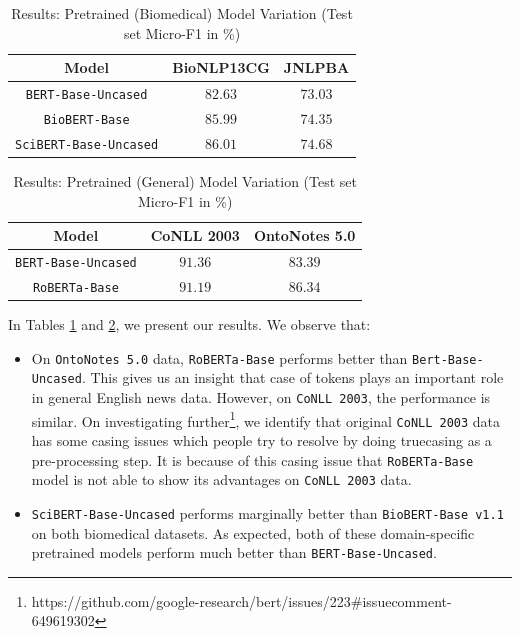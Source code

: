 \begin{table}[h!]
\centering
\begin{tabular}{|c|c|c|}\hline
	\textbf{Model} & \textbf{BioNLP13CG} & \textbf{JNLPBA}\\\hline
	\texttt{BERT-Base-Uncased} & $82.63$ & $73.03$\\\hline
	\texttt{BioBERT-Base} & $85.99$ & $74.35$\\\hline
	\texttt{SciBERT-Base-Uncased} & $86.01$ & $74.68$\\\hline
	\end{tabular}
    \caption{Results: Pretrained (Biomedical) Model Variation (Test set Micro-F1 in \%)}
    \label{tab:res_pretrained_model_bio}
\end{table}

\begin{table}[h!]
\centering
\begin{tabular}{|c|c|c|}\hline
	\textbf{Model} & \textbf{CoNLL 2003} & \textbf{OntoNotes 5.0}\\\hline
	\texttt{BERT-Base-Uncased} & $91.36$ & $83.39$\\\hline
	\texttt{RoBERTa-Base} & $91.19$ & $86.34$\\\hline
	\end{tabular}
    \caption{Results: Pretrained (General) Model Variation (Test set Micro-F1 in \%)}
    \label{tab:res_pretrained_model_general}
\end{table}

In Tables \ref{tab:res_pretrained_model_bio} and \ref{tab:res_pretrained_model_general}, we present our results. We observe that:

\begin{itemize}
    \item On \texttt{OntoNotes 5.0} data, \texttt{RoBERTa-Base} performs better than \texttt{Bert-Base-Uncased}. This gives us an insight that case of tokens plays an important role in general English news data. However, on \texttt{CoNLL 2003}, the performance is similar. On investigating further\footnote{https://github.com/google-research/bert/issues/223\#issuecomment-649619302}, we identify that original \texttt{CoNLL 2003} data has some casing issues which people try to resolve by doing truecasing as a pre-processing step. It is because of this casing issue that \texttt{RoBERTa-Base} model is not able to show its advantages on \texttt{CoNLL 2003} data.
    
    \item \texttt{SciBERT-Base-Uncased} performs marginally better than \texttt{BioBERT-Base v1.1} on both biomedical datasets. As expected, both of these domain-specific pretrained models perform much better than \texttt{BERT-Base-Uncased}. 
\end{itemize}

